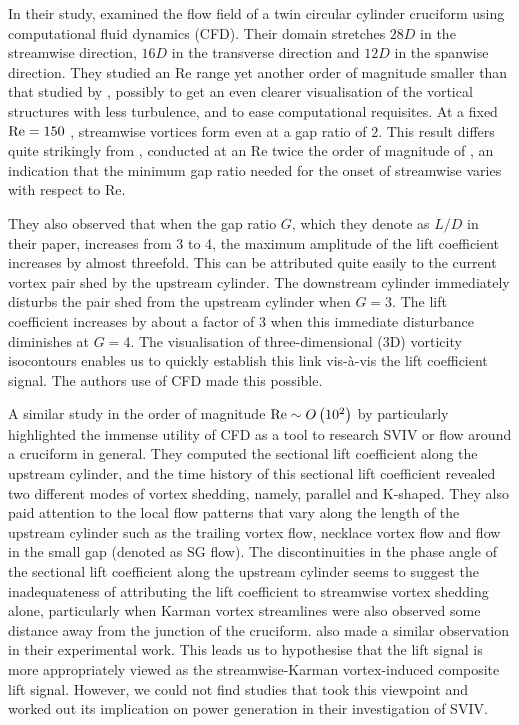 \documentclass[oneside]{utmthesis}
\begin{document}
In their study, \citet{Deng2007} examined the flow field of a twin circular cylinder cruciform using computational fluid dynamics (CFD). Their domain stretches  $28D$  in the streamwise direction,  $16D$  in the transverse direction and  $12D$  in the spanwise direction. They studied an Re range yet another order of magnitude smaller than that studied by \citet{Koide2017}, possibly to get an even clearer visualisation of the vortical structures with less turbulence, and to ease computational requisites. At a fixed  $\text{Re} = 150$ , streamwise vortices form even at a gap ratio of $2$. This result differs quite strikingly from \citet{Koide2006,Koide2007}, conducted at an Re twice the order of magnitude of \citet{Deng2007}, an indication that the minimum gap ratio needed for the onset of streamwise varies with respect to Re.

They also observed that when the gap ratio $G$, which they denote as  $L/D$  in their paper, increases from 3 to 4, the maximum amplitude of the lift coefficient increases by almost threefold. This can be attributed quite easily to the current vortex pair shed by the upstream cylinder. The downstream cylinder immediately disturbs the pair shed from the upstream cylinder when  $G=3$. The lift coefficient increases by about a factor of 3 when this immediate disturbance diminishes at  $G=4$. The visualisation of three-dimensional (3D) vorticity isocontours enables us to quickly establish this link vis-\`{a}-vis the lift coefficient signal. The authors use of CFD made this possible.

A similar study in the order of magnitude $\text{Re} \sim O \left( 10^{2} \right)$ by \citet{Zhao2018a} particularly highlighted the immense utility of CFD as a tool to research SVIV or flow around a cruciform in general. They computed the sectional lift coefficient along the upstream cylinder, and the time history of this sectional lift coefficient revealed two different modes of vortex shedding, namely, parallel and K-shaped. They also paid attention to the local flow patterns that vary along the length of the upstream cylinder such as the trailing vortex flow, necklace vortex flow and flow in the small gap (denoted as SG flow). The discontinuities in the phase angle of the sectional lift coefficient along the upstream cylinder seems to suggest the inadequateness of attributing the lift coefficient to streamwise vortex shedding alone, particularly when Karman vortex streamlines were also observed some distance away from the junction of the cruciform. \citet{Shirakashi1989} also made a similar observation in their experimental work. This leads us to hypothesise that the lift signal is more appropriately viewed as the streamwise-Karman vortex-induced composite lift signal. However, we could not find studies that took this viewpoint and worked out its implication on power generation in their investigation of SVIV.
\end{document}
